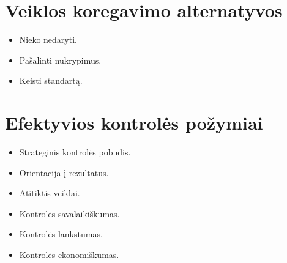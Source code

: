 \section{Veiklos koregavimo alternatyvos}

\begin{itemize}
  \item Nieko nedaryti.
  \item Pašalinti nukrypimus.
  \item Keisti standartą.
\end{itemize}

\section{Efektyvios kontrolės požymiai}

\begin{itemize}
  \item Strateginis kontrolės pobūdis.
  \item Orientacija į rezultatus.
  \item Atitiktis veiklai.
  \item Kontrolės savalaikiškumas.
  \item Kontrolės lankstumas.
  \item Kontrolės ekonomiškumas.
\end{itemize}
